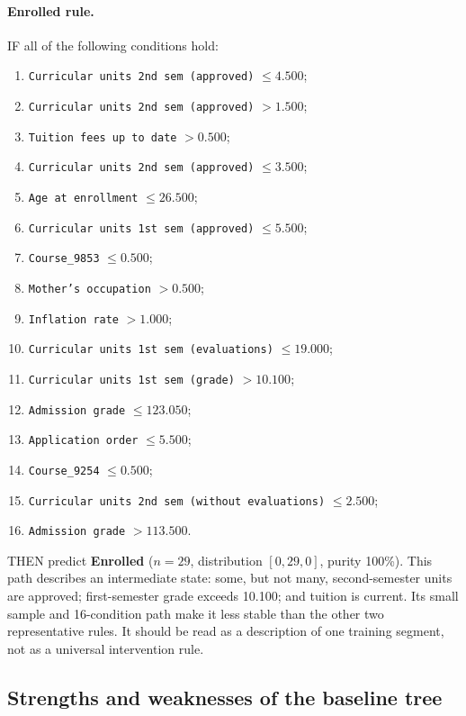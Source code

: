 \paragraph{Enrolled rule.}
IF all of the following conditions hold:
\begin{enumerate}
  \small
  \setlength{\itemsep}{0.1em}
  \item \texttt{Curricular units 2nd sem (approved)} $\leq 4.500$;
  \item \texttt{Curricular units 2nd sem (approved)} $> 1.500$;
  \item \texttt{Tuition fees up to date} $> 0.500$;
  \item \texttt{Curricular units 2nd sem (approved)} $\leq 3.500$;
  \item \texttt{Age at enrollment} $\leq 26.500$;
  \item \texttt{Curricular units 1st sem (approved)} $\leq 5.500$;
  \item \texttt{Course\_9853} $\leq 0.500$;
  \item \texttt{Mother's occupation} $> 0.500$;
  \item \texttt{Inflation rate} $> 1.000$;
  \item \texttt{Curricular units 1st sem (evaluations)} $\leq 19.000$;
  \item \texttt{Curricular units 1st sem (grade)} $> 10.100$;
  \item \texttt{Admission grade} $\leq 123.050$;
  \item \texttt{Application order} $\leq 5.500$;
  \item \texttt{Course\_9254} $\leq 0.500$;
  \item \texttt{Curricular units 2nd sem (without evaluations)} $\leq 2.500$;
  \item \texttt{Admission grade} $> 113.500$.
\end{enumerate}
THEN predict \textbf{Enrolled} ($n=29$, distribution $[0,29,0]$, purity
100\%). This path describes an intermediate state: some, but not many,
second-semester units are approved; first-semester grade exceeds 10.100; and
tuition is current. Its small sample and 16-condition path make it less stable
than the other two representative rules. It should be read as a description of
one training segment, not as a universal intervention rule.

\subsection{Strengths and weaknesses of the baseline tree}

